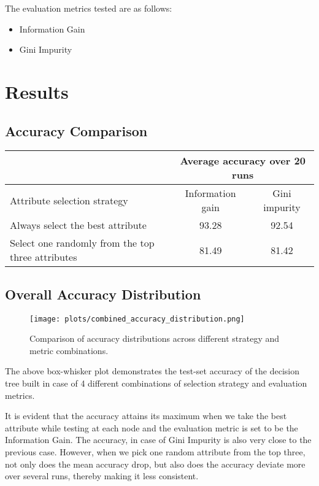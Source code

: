 \documentclass[12pt]{article}
\begin{document}
The evaluation metrics tested are as follows:
\begin{itemize}
    \item Information Gain
    \item Gini Impurity
\end{itemize}

\newpage

\section{Results} 


\subsection{Accuracy Comparison}
\begin{table}[h]
\centering
\begin{tabular}{|p{5cm}|c|c|}
\hline
& \multicolumn{2}{c|}{Average accuracy over 20 runs} \\
\hline
Attribute selection strategy & Information gain & Gini impurity \\
\hline
Always select the best attribute & 93.28 & 92.54 \\
\hline
Select one randomly from the top three attributes & 81.49 & 81.42 \\
\hline
\end{tabular}
\end{table}


\subsection{Overall Accuracy Distribution}
\begin{figure}[H]
    \centering
    \texttt{[image: plots/combined\_accuracy\_distribution.png]}
    \caption{Comparison of accuracy distributions across different strategy and metric combinations.}
    \label{fig:combined-accuracy}
\end{figure}

The above box-whisker plot demonstrates the test-set accuracy of the decision tree built in case of 4 different combinations of selection strategy and evaluation metrics.

It is evident that the accuracy attains its maximum when we take the best attribute while testing at each node and the evaluation metric is set to be the Information Gain. The accuracy, in case of Gini Impurity is also very close to the previous case. However, when we pick one random attribute from the top three, not only does the mean accuracy drop, but also does the accuracy deviate more over several runs, thereby making it less consistent.
\end{document}
